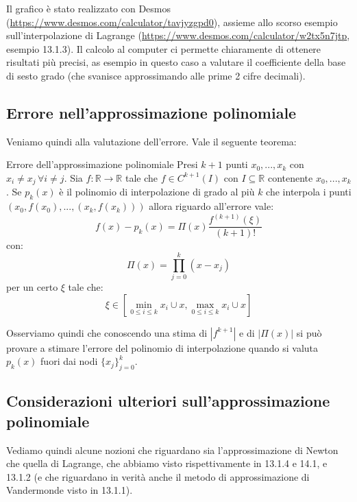\documentclass[a4paper,11pt]{article}
\begin{document}
Il grafico è stato realizzato con Desmos (\url{https://www.desmos.com/calculator/tavjyzgpd0}), assieme allo scorso esempio sull'interpolazione di Lagrange (\url{https://www.desmos.com/calculator/w2tx5n7jtp}, esempio 13.1.3).
Il calcolo al computer ci permette chiaramente di ottenere risultati più precisi, as esempio in questo caso a valutare il coefficiente della base di sesto grado (che svanisce approssimando alle prime 2 cifre decimali). 

\newpage

\subsection{Errore nell'approssimazione polinomiale}
Veniamo quindi alla valutazione dell'errore.
Vale il seguente teorema:
\begin{theorem}{Errore dell'approssimazione polinomiale}
	Presi $k + 1$ punti $x_0, ..., x_k$ con $x_i \neq x_j \, \forall i \neq j$.
	Sia $f: \mathbb{R} \rightarrow \mathbb{R}$ tale che $f \in C^{k + 1}(I)$ con $I \subseteq \mathbb{R}$ contenente $x_0, ..., x_k$.
	Se $p_k(x)$ è il polinomio di interpolazione di grado al più $k$ che interpola i punti $(x_0, f(x_0), ..., (x_k, f(x_k)))$ allora riguardo all'errore vale:
$$
f(x) - p_k(x) = \Pi(x) \frac{f^{(k + 1)}(\xi)}{(k + 1)!}
$$
con:
$$
\Pi(x) = \prod_{j = 0}^k (x - x_j)
$$
per un certo $\xi$ tale che:
$$
\xi \in \left[ \min_{0 \leq i \leq k} x_i \cup x, \max_{0 \leq i \leq k} x_i \cup x \right]
$$
\end{theorem}

Osserviamo quindi che conoscendo una stima di $|f^{k + 1}|$ e  di $|\Pi(x)|$ si può provare a stimare l'errore del polinomio di interpolazione quando si valuta $p_k(x)$ fuori dai nodi $\{ x_j \}_{j=0}^k$.

\subsection{Considerazioni ulteriori sull'approssimazione polinomiale}
Vediamo quindi alcune nozioni che riguardano sia l'approssimazione di Newton che quella di Lagrange, che abbiamo visto rispettivamente in 13.1.4 e 14.1, e 13.1.2 (e che riguardano in verità anche il metodo di approssimazione di Vandermonde visto in 13.1.1).
\end{document}
